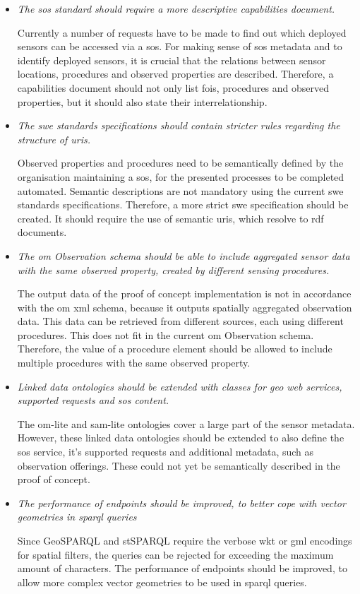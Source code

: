 \begin{itemize}
	\item \textit{The \ac{sos} standard should require a more descriptive capabilities document.}
	
	Currently a number of requests have to be made to find out which deployed sensors can be accessed via a \ac{sos}. For making sense of \ac{sos} metadata and to identify deployed sensors, it is crucial that the relations between sensor locations, procedures and observed properties are described. Therefore, a capabilities document should not only list \acp{foi}, procedures and observed properties, but it should also state their interrelationship.    
	
	
	\item \textit{The \ac{swe} standards specifications should contain stricter rules regarding the structure of \acp{uri}.}
	
	Observed properties and procedures need to be semantically defined by the organisation maintaining a \ac{sos}, for the presented processes to be completed automated. Semantic descriptions are not mandatory using the current \ac{swe} standards specifications. Therefore, a more strict \ac{swe} specification should be created. It should require the use of semantic \acp{uri}, which resolve to \ac{rdf} documents. 
	
	
	\item \textit{The \ac{om} Observation schema should be able to include aggregated sensor data with the same observed property, created by different sensing procedures.}
	
	The output data of the proof of concept implementation is not in accordance with the \ac{om} \ac{xml} schema, because it outputs spatially aggregated observation data. This data can be retrieved from different sources, each using different procedures. This does not fit in the current \ac{om} Observation schema. Therefore, the value of a procedure element should be allowed to include multiple procedures with the same observed property.   

	
	\item \textit{Linked data ontologies should be extended with classes for geo web services, supported requests and \ac{sos} content.}
	
	The om-lite and sam-lite ontologies cover a large part of the sensor metadata. However, these linked data ontologies should be extended to also define the \ac{sos} service, it's supported requests and additional metadata, such as observation offerings. These could not yet be semantically described in the proof of concept.
	
	
	\item \textit{The performance of endpoints should be improved, to better cope with vector geometries in \ac{sparql} queries}
	
	Since GeoSPARQL and stSPARQL require the verbose \ac{wkt} or \acs{gml} encodings for spatial filters, the queries can be rejected for exceeding the maximum amount of characters. The performance of endpoints should be improved, to allow more complex vector geometries to be used in \ac{sparql} queries. 
	
\end{itemize}




